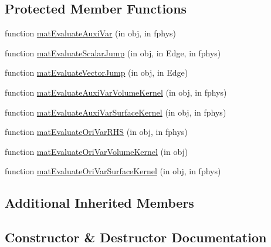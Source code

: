 \subsection*{Protected Member Functions}
\begin{DoxyCompactItemize}
\item 
function \hyperlink{class_ndg_quad_free_strong_l_d_g_vis_solver2d_a56527955846c405f50548afe331afa4f}{mat\+Evaluate\+Auxi\+Var} (in obj, in fphys)
\item 
function \hyperlink{class_ndg_quad_free_strong_l_d_g_vis_solver2d_ab3a3db515e839f7b4439e076be8c3746}{mat\+Evaluate\+Scalar\+Jump} (in obj, in Edge, in fphys)
\item 
function \hyperlink{class_ndg_quad_free_strong_l_d_g_vis_solver2d_a0fde8875eff438ec55e3646129762255}{mat\+Evaluate\+Vector\+Jump} (in obj, in Edge)
\item 
function \hyperlink{class_ndg_quad_free_strong_l_d_g_vis_solver2d_ab6797602bc7f5d2df041f45f2a1bd6f4}{mat\+Evaluate\+Auxi\+Var\+Volume\+Kernel} (in obj, in fphys)
\item 
function \hyperlink{class_ndg_quad_free_strong_l_d_g_vis_solver2d_a4b4bc9fdb97b8b205ed5e3e3ab1f50ec}{mat\+Evaluate\+Auxi\+Var\+Surface\+Kernel} (in obj, in fphys)
\item 
function \hyperlink{class_ndg_quad_free_strong_l_d_g_vis_solver2d_a20cf144f693ddc85b293408d3f97a99d}{mat\+Evaluate\+Ori\+Var\+R\+HS} (in obj, in fphys)
\item 
function \hyperlink{class_ndg_quad_free_strong_l_d_g_vis_solver2d_aeb04662e38f95ba9cf37e5e986a16352}{mat\+Evaluate\+Ori\+Var\+Volume\+Kernel} (in obj)
\item 
function \hyperlink{class_ndg_quad_free_strong_l_d_g_vis_solver2d_a5286ba78c499d1cccdb069e2f738cc17}{mat\+Evaluate\+Ori\+Var\+Surface\+Kernel} (in obj, in fphys)
\end{DoxyCompactItemize}
\subsection*{Additional Inherited Members}


\subsection{Constructor \& Destructor Documentation}
\mbox{\label{class_ndg_quad_free_strong_l_d_g_vis_solver2d_a495a34183b55abf7f1485f0d4c964ce8}} 
